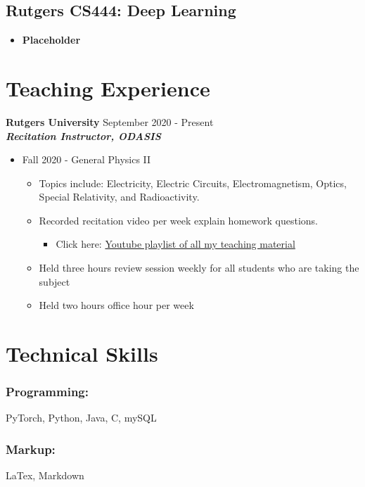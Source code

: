 \documentclass{article}
\begin{document}
\subsection*{Rutgers CS444: Deep Learning}

\begin{itemize}
  \itemsep0em
  \item \textbf{Placeholder}
\end{itemize}


\section{Teaching Experience}
\textbf{Rutgers University}
\hfill{September 2020 - Present}\\
\textit{\textbf{Recitation Instructor, ODASIS}}
\begin{itemize}
  \item Fall 2020 - General Physics II
  \begin{itemize}
  	\item Topics include: Electricity, Electric Circuits, Electromagnetism, Optics, Special Relativity, and Radioactivity.
     \item Recorded recitation video per week explain homework questions.
     \begin{itemize}
		\item Click here: \href{https://www.youtube.com/playlist?list=PLhDL674NFL2ggH1tSbZzek3hs83dwfa25}{Youtube playlist of all my teaching material}
     \end{itemize}
     \item Held three hours review session weekly for all students who are taking the subject
 	 \item Held two hours office hour per week
  \end{itemize}
\end{itemize}


\section{Technical Skills}

\subsubsection{Programming:}

PyTorch, Python, Java, C, mySQL

\subsubsection{Markup:}

LaTex, Markdown
\end{document}
